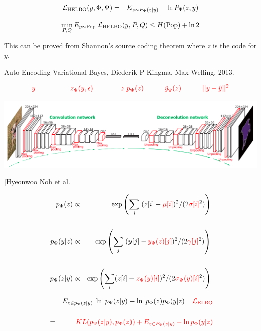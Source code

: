 {

\begin{eqnarray*}
{\cal L}_{\mathrm{HELBO}}(y,\Phi,\Psi) &  = &  E_{z \sim P_\Psi(z|y)} - \ln P_\Phi(z,y)
\end{eqnarray*}


\vfill
{\color{red} $$\min_{P,Q} E_{y \sim \mathrm{Pop}}\;{\cal L}_{\mathrm{HELBO}}(y,P,Q) \leq H(\mathrm{Pop}) + \ln 2$$}

\vfill
This can be proved from Shannon's source coding theorem where $z$ is the code for $y$.


Auto-Encoding Variational Bayes, Diederik P Kingma, Max Welling, 2013.

\vfill
$${\color{red}y \hspace{5em}  z_\Psi(y,\epsilon) \hspace{4em} z\;p_\Phi(z) \hspace{3em} \hat{y}_\Phi(z) \hspace{3em}||y - \hat{y}||^2}$$
\centerline{\includegraphics[width=9in]{../images/Deconv}}

\centerline{\Large [Hyeonwoo Noh et al.]}


\begin{eqnarray*}
p_\Phi(z) & \propto & \exp\left(\sum_i \;(z[i] - {\color{red} \mu[i]})^2/(2{\color{red} \sigma[i]}^2)\right) \\
\\
p_\Phi(y|z) & \propto & \exp\left(\sum_j\;(y[j] - {\color{red} y_\Phi(z)[j]})^2/(2{\color{red} \gamma[j]}^2)\right) \\
\\
p_\Psi(z|y) & \propto & \exp\left(\sum_i (z[i] - {\color{red} z_\Psi(y)[i]})^2/(2{\color{red} \sigma_\Psi(y)[i]}^2)\right)
\end{eqnarray*}


\begin{eqnarray*}
&  & E_{z \in p_\Psi(z|y)}\;\ln\;p_\Psi(z|y) - \ln\;p_\Phi(z)p_\Phi(y|z) \;\;\;\;{\color{red} {\cal L}_{\mathrm{ELBO}}} \\
\\
& = & {\color{red}  KL(p_\Psi(z|y),p_\Phi(z)) + E_{z \in P_\Psi(z|y)} - \ln p_\Phi(y|z)}
\end{eqnarray*}

}
